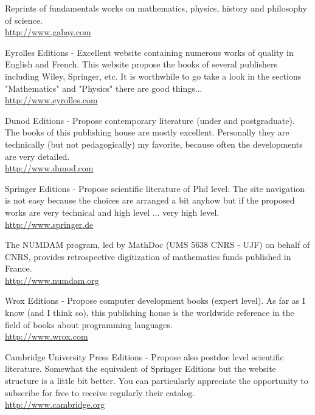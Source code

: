 	{\Large {}}{\Large {}}{\Large {}}{\Large {}}\bcdfrance{} Reprints of fundamentals works on mathematics, physics, history and philosophy of science.\\
	\href{http://www.gabay.com}{\color{blue}http://www.gabay.com}
	
	\pagebreak
	{\Large {}}{\Large {}}{\Large {}}{\Large {}}\bcdfrance{} Eyrolles Editions - Excellent website containing numerous works of quality in English and French. This website propose the books of several publishers including Wiley, Springer, etc. It is worthwhile to go take a look in the sections "Mathematics" and "Physics" there are good things... \\
	\href{http://www.eyrolles.com}{\color{blue}http://www.eyrolles.com}
	
	{\Large {}}{\Large {}}{\Large {}}{\Large {}}\bcdfrance{} Dunod Editions - Propose contemporary literature (under and postgraduate). The books of this publishing house are mostly excellent. Personally they are technically (but not pedagogically) my favorite, because often the developments are very detailed.\\
	\href{http://www.dunod.com}{\color{blue}http://www.dunod.com}
	
	{\Large {}}{\Large {}} Springer Editions - Propose scientific literature of Phd level. The site navigation is not easy because the choices are arranged a bit anyhow but if the proposed works are very technical and high level ... very high level.\\
	\href{http://www.springer.de}{\color{blue}http://www.springer.de}
	
	{\Large {}}{\Large {}}{\Large {}}\bcdfrance{} The NUMDAM program, led by MathDoc (UMS 5638 CNRS - UJF) on behalf of CNRS, provides retrospective digitization of mathematics funds published in France.\\
	\href{http://www.numdam.org}{\color{blue}http://www.numdam.org}
	
	{\Large {}}{\Large {}}{\Large {}}{\Large {}} Wrox Editions - Propose computer development books (expert level). As far as I know (and I think so), this publishing house is the worldwide reference in the field of books about programming languages.\\
	\href{http://www.wrox.com}{\color{blue}http://www.wrox.com}
	
	{\Large {}}{\Large {}}{\Large {}} Cambridge University Press Editions - Propose also postdoc level scientific literature. Somewhat the equivalent of Springer Editions but the website structure is a little bit better. You can particularly appreciate the opportunity to subscribe for free to receive regularly their catalog.\\
	\href{http://www.cambridge.org}{\color{blue}http://www.cambridge.org}
	
